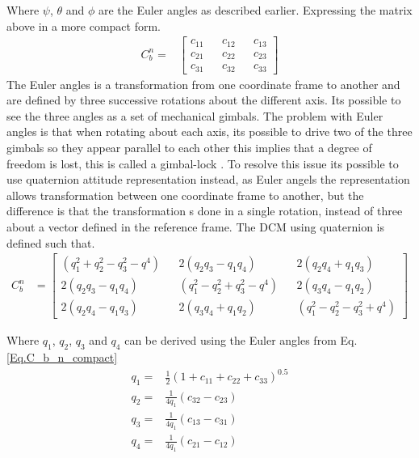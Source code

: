 Where $\psi$, $\theta$ and $\phi$ are the Euler angles as described earlier. Expressing the matrix above in a more compact form.
\begin{align}
C_b^n = &
\begin{bmatrix}
c_{11} && c_{12} && c_{13}\\
c_{21} && c_{22} && c_{23} \\
c_{31} && c_{32} && c_{33}
\end{bmatrix}
\label{Eq.C_b_n_compact}
\end{align}
The Euler angles is a transformation from one coordinate frame to another and are defined by three successive rotations about the different axis. Its possible to see the three angles as a set of mechanical gimbals. 
The problem with Euler angles is that when rotating about each axis, its possible to drive two of the three gimbals so they appear parallel to each other this implies that a degree of freedom is lost, this is called a gimbal-lock \cite{nonlinear}. To resolve this issue its possible to use quaternion attitude representation instead, as Euler angels the representation allows transformation between one coordinate frame to another, but the difference is that the transformation s done in a single rotation, instead of three	 about a vector defined in the reference frame. The DCM using quaternion is defined such that\cite{nonlinear}.
\begin{align}
C_b^n & =
\begin{bmatrix}
(q_1^2 + q_2^2 - q_3^2-q^4) && 2(q_2q_3 - q_1q_4) && 2(q_2q_4 + q_1q_3) \\
2(q_2q_3 - q_1q_4) && (q_1^2 - q_2^2 + q_3^2-q^4) && 2(q_3q_4 - q_1q_2) \\
2(q_2q_4 - q_1q_3) && 2(q_3q_4 + q_1q_2) && (q_1^2 - q_2^2 - q_3^2+q^4)
\end{bmatrix}
\end{align}

Where $q_1$, $q_2$, $q_3$ and $q_4$ can be derived using the Euler angles from Eq. \eqref{Eq.C_b_n_compact}
\begin{align*}
q_1 =& \frac{1}{2}(1+c_{11} + c_{22} + c_{33})^{0.5} \\
q_2 =& \frac{1}{4q_1}(c_{32} - c_{23})\\
q_3 =& \frac{1}{4q_1}(c_{13} - c_{31})\\
q_4 =& \frac{1}{4q_1}(c_{21} - c_{12})\\
\end{align*}


